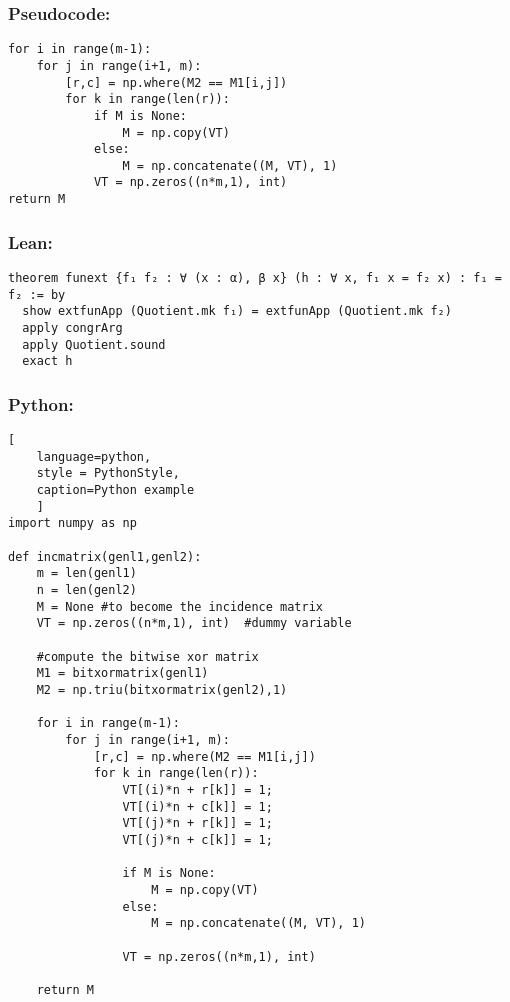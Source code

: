 

\subsubsection*{Pseudocode:}

\begin{lstlisting}[style = PsC_Style, caption=Pseudocode]
for i in range(m-1):
    for j in range(i+1, m):
        [r,c] = np.where(M2 == M1[i,j])
        for k in range(len(r)):
            if M is None:
                M = np.copy(VT)
            else:
                M = np.concatenate((M, VT), 1)
            VT = np.zeros((n*m,1), int)
return M
\end{lstlisting}

\subsubsection*{Lean:}

\begin{lstlisting}[language=lean]
theorem funext {f₁ f₂ : ∀ (x : α), β x} (h : ∀ x, f₁ x = f₂ x) : f₁ = f₂ := by
  show extfunApp (Quotient.mk f₁) = extfunApp (Quotient.mk f₂)
  apply congrArg
  apply Quotient.sound
  exact h
\end{lstlisting}


\subsubsection*{Python:}

\begin{lstlisting}[
    language=python,
    style = PythonStyle,
    caption=Python example
    ]
import numpy as np
    
def incmatrix(genl1,genl2):
    m = len(genl1)
    n = len(genl2)
    M = None #to become the incidence matrix
    VT = np.zeros((n*m,1), int)  #dummy variable
    
    #compute the bitwise xor matrix
    M1 = bitxormatrix(genl1)
    M2 = np.triu(bitxormatrix(genl2),1) 

    for i in range(m-1):
        for j in range(i+1, m):
            [r,c] = np.where(M2 == M1[i,j])
            for k in range(len(r)):
                VT[(i)*n + r[k]] = 1;
                VT[(i)*n + c[k]] = 1;
                VT[(j)*n + r[k]] = 1;
                VT[(j)*n + c[k]] = 1;
                
                if M is None:
                    M = np.copy(VT)
                else:
                    M = np.concatenate((M, VT), 1)
                
                VT = np.zeros((n*m,1), int)
    
    return M
\end{lstlisting}


